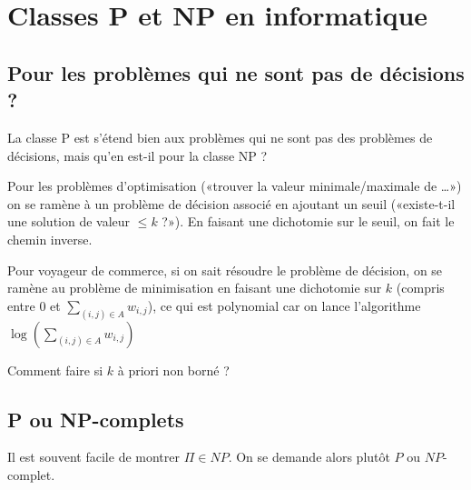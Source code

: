 \section{Classes P et NP en informatique}

\subsection{Pour les problèmes qui ne sont pas de décisions ?}

\begin{rem}
	La classe P est s'étend bien aux problèmes qui ne sont pas des problèmes de décisions, mais qu'en est-il pour la classe NP ?
\end{rem}

\begin{personalise}[Méthode]
	Pour les problèmes d'optimisation («trouver la valeur minimale/maximale de \dots») on se ramène à un problème de décision associé en ajoutant un seuil («existe-t-il une solution de valeur $\leq k$ ?»). En faisant une dichotomie sur le seuil, on fait le chemin inverse.
\end{personalise}

\begin{example}
	Pour voyageur de commerce, si on sait résoudre le problème de décision, on se ramène au problème de minimisation en faisant une dichotomie sur $k$ (compris entre $0$ et $\sum\limits_{(i,j) \in A} w_{i,j}$), ce qui est polynomial car on lance l'algorithme $\log \left( \sum\limits_{(i,j) \in A} w_{i,j} \right)$
\end{example}

\begin{exercise}
	Comment faire si $k$ à priori non borné ?
\end{exercise}

\subsection{P ou NP-complets}

\begin{rem}
	Il est souvent facile de montrer $\Pi\in NP$. On se demande alors plutôt $P$ ou $NP$-complet.
\end{rem}

